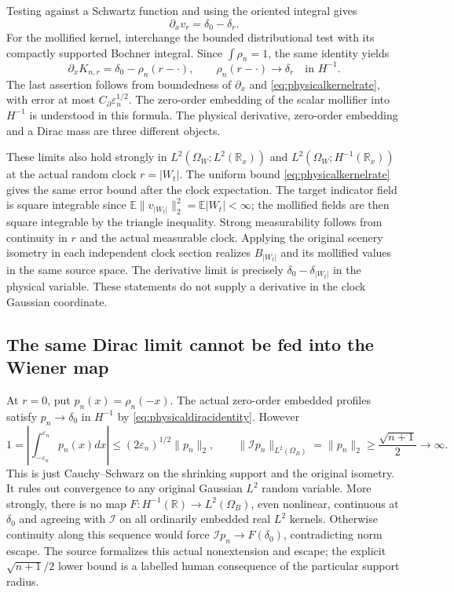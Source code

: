 \documentclass[11pt]{article}
\newcommand{\R}{\mathbb R}\newcommand{\E}{\mathbb E}
\begin{document}
Testing against a Schwartz function and using the oriented
integral gives
\[
 \partial_xv_r=\delta_0-\delta_r.
\]
For the mollified kernel, interchange the bounded distributional
test with its compactly supported Bochner integral. Since
$\int\rho_n=1$, the same identity yields
\begin{equation}\label{eq:physicaldiracidentity}
 \partial_xK_{n,r}=\delta_0-\rho_n(r-\cdot),\qquad
 \rho_n(r-\cdot)\longrightarrow\delta_r\quad\text{in }H^{-1}.
\end{equation}
The last assertion follows from boundedness of $\partial_x$ and
\eqref{eq:physicalkernelrate}, with error at most
$C_\partial\varepsilon_n^{1/2}$. The zero-order embedding of the
scalar mollifier into $H^{-1}$ is understood in this formula. The
physical derivative, zero-order embedding and a Dirac mass are
three different objects.

These limits also hold strongly in
$L^2(\Omega_W;L^2(\R_x))$ and
$L^2(\Omega_W;H^{-1}(\R_x))$ at the actual random clock
$r=|W_t|$. The uniform bound \eqref{eq:physicalkernelrate} gives the
same error bound after the clock expectation. The target indicator
field is square integrable since
$\E\|v_{|W_t|}\|_2^2=\E|W_t|<\infty$; the mollified fields are
then square integrable by the triangle inequality. Strong
measurability follows from continuity in $r$ and the actual
measurable clock. Applying the original scenery isometry in each
independent clock section realizes $B_{|W_t|}$ and its mollified
values in the same source space. The derivative limit is precisely
$\delta_0-\delta_{|W_t|}$ in the physical variable. These statements
do not supply a derivative in the clock Gaussian coordinate.

\subsection*{The same Dirac limit cannot be fed into the Wiener map}
At $r=0$, put $p_n(x)=\rho_n(-x)$. The actual zero-order embedded
profiles satisfy $p_n\to\delta_0$ in $H^{-1}$ by
\eqref{eq:physicaldiracidentity}. However
\[
 1=\left|\int_{-\varepsilon_n}^{\varepsilon_n}p_n(x)dx\right|
 \le(2\varepsilon_n)^{1/2}\|p_n\|_2,
 \qquad
 \|\mathcal Ip_n\|_{L^2(\Omega_B)}=\|p_n\|_2
       \ge\frac{\sqrt{n+1}}2\longrightarrow\infty.
\]
This is just Cauchy--Schwarz on the shrinking support and the
original isometry. It rules out convergence to any original
Gaussian $L^2$ random variable. More strongly, there is no map
$F:H^{-1}(\R)\to L^2(\Omega_B)$, even nonlinear, continuous at
$\delta_0$ and agreeing with $\mathcal I$ on all ordinarily
embedded real $L^2$ kernels. Otherwise continuity along this
sequence would force $\mathcal Ip_n\to F(\delta_0)$, contradicting
norm escape. The source formalizes this actual nonextension and
escape; the explicit $\sqrt{n+1}/2$ lower bound is a labelled human
consequence of the particular support radius.
\end{document}
